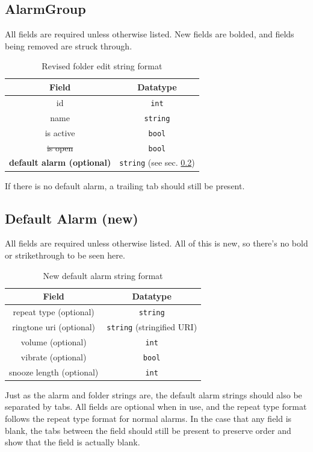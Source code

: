 \documentclass[11pt]{article} %
\begin{document}
\subsection{AlarmGroup}
\label{sec:folderChanges}
All fields are required unless otherwise listed. New fields are bolded, and fields being removed are struck through.
\begin{table}[H]
	\centering
	\begin{tabular}{c|c}
		Field & Datatype \\ \hline
		id & \verb|int| \\
		name & \verb|string| \\
		is active & \verb|bool| \\
		\sout{is open} & \verb|bool| \\
		\textbf{default alarm (optional)} & \verb|string| (see sec. \ref{sec:defAlarmString}) \\
	\end{tabular}
	\caption{Revised folder edit string format}
\end{table}

If there is no default alarm, a trailing tab should still be present. 

\subsection{Default Alarm (new)}
\label{sec:defAlarmString}
All fields are required unless otherwise listed. All of this is new, so there's no bold or strikethrough to be seen here.
\begin{table}[H]
	\centering
	\begin{tabular}{c|c}
		Field & Datatype \\ \hline
		repeat type (optional) & \verb|string| \\
		ringtone uri (optional) & \verb|string| (stringified URI) \\
		volume (optional) & \verb|int| \\
		vibrate (optional) & \verb|bool| \\
		snooze length (optional) & \verb|int| \\
	\end{tabular}
	\caption{New default alarm string format}
\end{table}

Just as the alarm and folder strings are, the default alarm strings should also be separated by tabs. All fields are optional when in use, and the repeat type format follows the repeat type format for normal alarms. In the case that any field is blank, the tabs between the field should still be present to preserve order and show that the field is actually blank.
\end{document}
